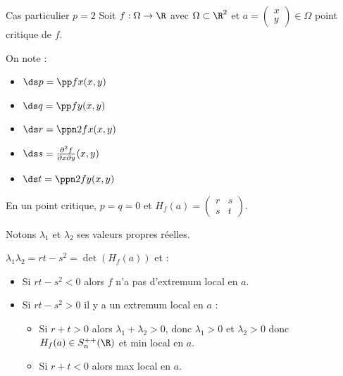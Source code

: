 \begin{proposition}{Cas particulier $p=2$}{}
    Soit $f : \Omega \to \R$ avec $\Omega \subset \R^2$ et 
    $a = \begin{pmatrix}
        x \\
        y
    \end{pmatrix} \in \Omega$ point critique de $f$.

    On note : 
    \begin{itemize}
        \item $\ds p = \pp f x (x, y)$
        \item $\ds q = \pp f y (x, y)$
        \item $\ds r = \ppn 2 f x (x, y)$
        \item $\ds s = \frac{\partial^2 f}{\partial x \partial y} (x, y)$
        \item $\ds t = \ppn 2 f y (x, y)$
    \end{itemize}

    En un point critique, $p = q = 0$ et $H_f(a) = \begin{pmatrix}
        r & s \\
        s & t
    \end{pmatrix}$.

    Notons $\lambda_1$ et $\lambda_2$ ses valeurs propres réelles. 

    $\lambda_1 \lambda_2 = rt - s^2= \det (H_f(a))$ et : 

    \begin{itemize}
        \item Si $rt - s^2 < 0$ alors $f$ n'a pas d'extremum local en $a$.
        \item Si $rt - s^2 > 0$ il y a un extremum local en $a$ :
        \begin{itemize}
            \item Si $r + t > 0$ alors $\lambda_1 + \lambda_2 > 0$, donc $\lambda_1 > 0$ et $\lambda_2 > 0$ donc $H_f(a) \in S_n^{++}(\R)$ et min local en $a$.
            \item Si $r + t < 0$ alors max local en $a$.
        \end{itemize}
    \end{itemize}
\end{proposition}
